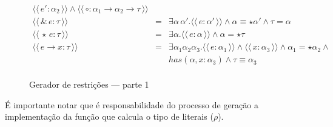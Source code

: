 \documentclass[a4paper,8pt]{article}
\newcommand{\constr}[1]{\ensuremath{\langle\langle\,#1\,\rangle\rangle}}
\begin{document}
\begin{figure}[h]
\[{\begin{array}{lcl}
                                                      \constr{e' :
                                                      \alpha_2} \land
                                                      \constr{\circ :
                                                      \alpha_1\to\alpha_2\to\tau}\\
                     \constr{\&\,e : \tau} & = & \exists \alpha\,
                                                 \alpha'. \constr{e :
                                                 \alpha'} \land
                                                 \alpha \equiv \star \alpha'
                                                 \land \tau = \alpha\\
                     \constr{\star\,e : \tau} & = & \exists
                                                    \alpha. \constr{e
                                                    : \alpha} \land
                                                    \alpha = \star \tau\\
                     \constr{e\to x : \tau} & = & \exists
                                                  \alpha_1\alpha_2\alpha_3. \constr{e
                                                  :\alpha_1} \land
                                                  \constr{x :
                                                  \alpha_3} \land
                                                  \alpha_1 = \star\alpha_2
                                                  \land\\
                          & & has(\alpha,x : \alpha_3) \land \tau
                              \equiv \alpha_3\\
            \end{array}}
       \]
       \centering
       \caption{Gerador de restrições --- parte 1}
       \label{figgen}
     \end{figure}

     É importante notar que é responsabilidade
     do processo de geração a implementação da função que calcula o
     tipo de literais ($\rho$).
\end{document}
